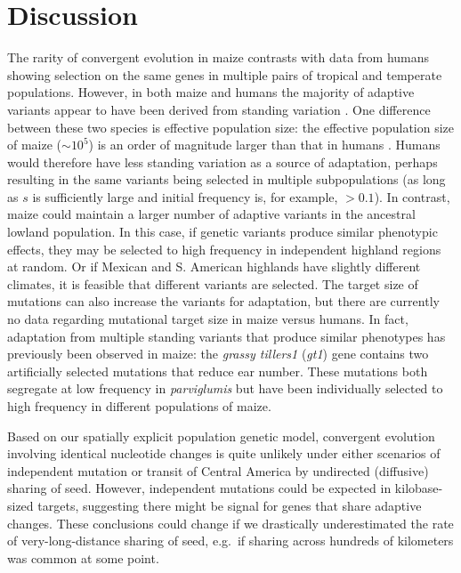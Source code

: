 \section*{Discussion}
The rarity of convergent evolution in maize contrasts with data from humans \citep{Tennessen_2011_21698142} showing selection on the same genes in multiple pairs of tropical and temperate populations.  
However, in both maize and humans the majority of adaptive variants appear to have been derived from standing variation \cite[]{Tennessen_2011_21698142}.
One difference between these two species is effective population size: the effective population size of maize ($\sim10^5$) is an order of magnitude larger than that in humans \cite[]{Takahata_1997_9114074}.
Humans would therefore have less standing variation as a source of adaptation, perhaps resulting in the same variants being selected in multiple subpopulations (as long as $s$ is sufficiently large and initial frequency is, for example, $>0.1$).
In contrast, maize could maintain a larger number of adaptive variants in the ancestral lowland population.
In this case, if genetic variants produce similar phenotypic effects, they may be selected to high frequency in independent highland regions at random.
Or if Mexican and S. American highlands have slightly different climates, it is feasible that different variants are selected.
The target size of mutations can also increase the variants for adaptation, but there are currently no data regarding mutational target size in maize versus humans.
 
In fact, adaptation from multiple standing variants that produce similar phenotypes has previously been observed in maize: the \emph{grassy tillers1} (\emph{gt1}) gene \cite[]{Wills_2013_23825971} contains two artificially selected mutations that reduce ear number.
These mutations both segregate at low frequency in \emph{parviglumis} but have been individually selected to high frequency in different populations of maize.

Based on our spatially explicit population genetic model, convergent evolution involving identical nucleotide changes is quite unlikely under either scenarios of independent mutation or transit of Central America by undirected (diffusive) sharing of seed. 
However, independent mutations could be expected in kilobase-sized targets, suggesting there might be signal for genes that share adaptive changes.
These conclusions could change if we drastically underestimated the rate of very-long-distance sharing of seed, e.g.\ if sharing across hundreds of kilometers was common at some point.

